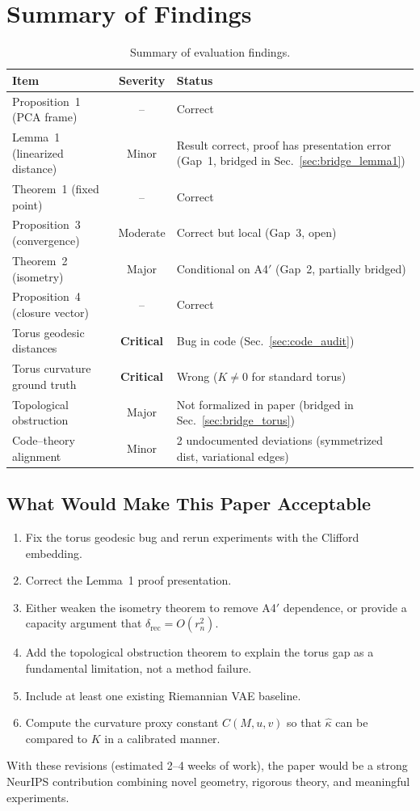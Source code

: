 \documentclass{article}
\begin{document}
\section{Summary of Findings}
\label{sec:summary}

\begin{table}[h]
\centering
\caption{Summary of evaluation findings.}
\begin{tabular}{p{5cm}cp{6cm}}
\toprule
\textbf{Item} & \textbf{Severity} & \textbf{Status} \\
\midrule
Proposition~1 (PCA frame) & -- & Correct \\
Lemma~1 (linearized distance) & Minor & Result correct, proof has
  presentation error (Gap~1, bridged in Sec.~\ref{sec:bridge_lemma1}) \\
Theorem~1 (fixed point) & -- & Correct \\
Proposition~3 (convergence) & Moderate & Correct but local (Gap~3, open) \\
Theorem~2 (isometry) & Major & Conditional on A4$'$ (Gap~2, partially bridged) \\
Proposition~4 (closure vector) & -- & Correct \\
Torus geodesic distances & \textbf{Critical} & Bug in code (Sec.~\ref{sec:code_audit}) \\
Torus curvature ground truth & \textbf{Critical} & Wrong ($K \neq 0$ for standard torus) \\
Topological obstruction & Major & Not formalized in paper (bridged in Sec.~\ref{sec:bridge_torus}) \\
Code--theory alignment & Minor & 2 undocumented deviations (symmetrized dist, variational edges) \\
\bottomrule
\end{tabular}
\end{table}

\subsection{What Would Make This Paper Acceptable}

\begin{enumerate}
\item Fix the torus geodesic bug and rerun experiments with the Clifford
  embedding.
\item Correct the Lemma~1 proof presentation.
\item Either weaken the isometry theorem to remove A4$'$ dependence, or
  provide a capacity argument that $\delta_{\text{rec}} = O(r_n^2)$.
\item Add the topological obstruction theorem to explain the torus gap
  as a fundamental limitation, not a method failure.
\item Include at least one existing Riemannian VAE baseline.
\item Compute the curvature proxy constant $C(M, u, v)$ so that
  $\hat{\kappa}$ can be compared to $K$ in a calibrated manner.
\end{enumerate}

With these revisions (estimated 2--4 weeks of work), the paper would be a
strong NeurIPS contribution combining novel geometry, rigorous theory, and
meaningful experiments.
\end{document}
